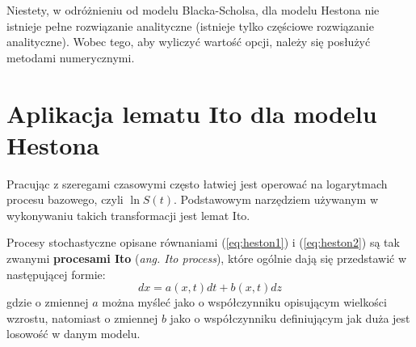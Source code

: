 \documentclass{pracamgr}
\begin{document}
Niestety, w odróżnieniu od modelu Blacka-Scholsa, dla modelu Hestona nie istnieje pełne rozwiązanie 
analityczne (istnieje tylko częściowe rozwiązanie analityczne). Wobec tego, aby 
wyliczyć wartość opcji, należy się posłużyć metodami numerycznymi.

\section{Aplikacja lematu Ito dla modelu Hestona}

Pracując z szeregami czasowymi często łatwiej jest operować na 
logarytmach procesu bazowego, czyli $\ln S(t)$.
Podstawowym narzędziem używanym w wykonywaniu takich transformacji jest lemat Ito.

Procesy stochastyczne opisane równaniami (\ref{eq:heston1}) i (\ref{eq:heston2}) są tak 
zwanymi \textbf{procesami Ito}
(\textit{ang. Ito process}), które ogólnie dają się przedstawić w 
następującej formie:
\begin{equation}
  dx = a(x,t) dt + b(x,t) dz
\end{equation}
gdzie o zmiennej $a$ można myśleć jako o współczynniku opisującym
wielkości wzrostu, natomiast 
o zmiennej $b$ jako o współczynniku definiującym jak duża jest losowość w danym 
modelu.
\end{document}
